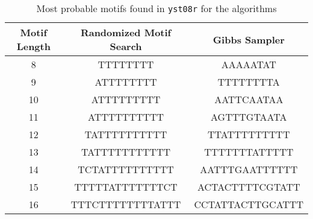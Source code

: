 \begin{table}[!h]
	\centering
	\begin{tabular}{|c|c|c|}
		\hline
		\textbf{Motif Length} & \textbf{Randomized Motif Search} & \textbf{Gibbs Sampler} \\
		\hline
		8                     & TTTTTTTT                         & AAAAATAT               \\
		9                     & ATTTTTTTT                        & TTTTTTTTA              \\
		10                    & ATTTTTTTTT                       & AATTCAATAA             \\
		11                    & ATTTTTTTTTT                      & AGTTTGTAATA            \\
		12                    & TATTTTTTTTTT                     & TTATTTTTTTTT           \\
		13                    & TATTTTTTTTTTT                    & TTTTTTTATTTTT          \\
		14                    & TCTATTTTTTTTTT                   & AATTTGAATTTTTT         \\
		15                    & TTTTTATTTTTTTCT                  & ACTACTTTTCGTATT        \\
		16                    & TTTCTTTTTTTTATTT                 & CCTATTACTTGCATTT       \\
		\hline
	\end{tabular}
	\caption{Most probable motifs found in \texttt{yst08r} for the algorithms}

\end{table}

